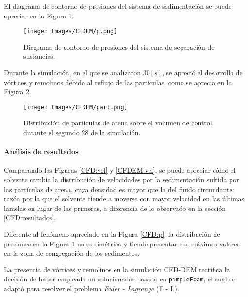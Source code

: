 El diagrama de contorno de presiones del sistema de sedimentaci\'on se puede apreciar en la Figura \ref{CFDEM:p}.

\begin{figure}[h!]
	\centering
	\texttt{[image: Images/CFDEM/p.png]}
	\caption{Diagrama de contorno de presiones del sistema de separaci\'on de sustancias.}
	\label{CFDEM:p}
\end{figure}

\noindent
\justify

Durante la simulaci\'on, en el que se analizaron $30 [s]$, se apreci\'o el desarrollo de v\'ortices y remolinos debido al reflujo de las part\'iculas, como se aprecia en la Figura \ref{CFDEM:part}.

\begin{figure}[h!]
	\centering
	\texttt{[image: Images/CFDEM/part.png]}
	\caption{Distribuci\'on de part\'iculas de arena sobre el volumen de control durante el segundo $28$ de la simulaci\'on.}
	\label{CFDEM:part}
\end{figure}

\newpage

\paragraph{An\'alisis de resultados}

\noindent
\justify

Comparando las Figuras \ref{CFD:vel} y \ref{CFDEM:vel}, se puede apreciar c\'omo el solvente cambia la distribuci\'on de velocidades por la sedimentaci\'on sufrida por las part\'iculas de arena, cuya densidad es mayor que la del fluido circundante; raz\'on por la que el solvente tiende a moverse con mayor velocidad en las \'ultimas lamelas en lugar de las primeras, a diferencia de lo observado en la secci\'on \ref{CFD:resultados}.

\noindent
\justify

Diferente al fen\'omeno apreciado en la Figura \ref{CFD:p}, la distribuci\'on de presiones en la Figura \ref{CFDEM:p} no es sim\'etrica y tiende presentar sus m\'aximos valores en la zona de congregaci\'on de los sedimentos.

\noindent
\justify

La presencia de v\'ortices y remolinos en la simulaci\'on CFD-DEM rectifica la decisi\'on de haber empleado un solucionador basado en \texttt{pimpleFoam}, el cual se adapt\'o para resolver el problema \textit{Euler - Lagrange} (E - L).

